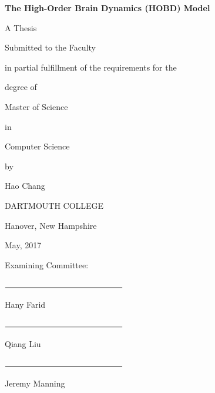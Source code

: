 \documentclass[11pt]{article}
\begin{document}
{\centering
  \textbf{The High-Order Brain Dynamics (HOBD) Model}\par
  A Thesis\par
  Submitted to the Faculty\par
  in partial fulfillment of the requirements for the\par
  degree of\par
  Master of Science\par
  in\par
  Computer Science\par
  by\par
  Hao Chang\par
  DARTMOUTH COLLEGE\par
  Hanover, New Hampshire\par
  May, 2017\par
}
\vspace{5mm}
\setlength{\parskip}{0em}
\begin{flushright}
Examining Committee:\par
\vspace{5mm}
$\rule{5cm}{0.15mm}$\par
Hany Farid\par
\vspace{5mm}
$\rule{5cm}{0.15mm}$\par
Qiang Liu\par
\vspace{5mm}
$\rule{5cm}{0.25mm}$\par
Jeremy Manning\par
\end{flushright}
\setlength{\parskip}{1em}
\newpage


\null\par
\newpage
{}
\end{document}
